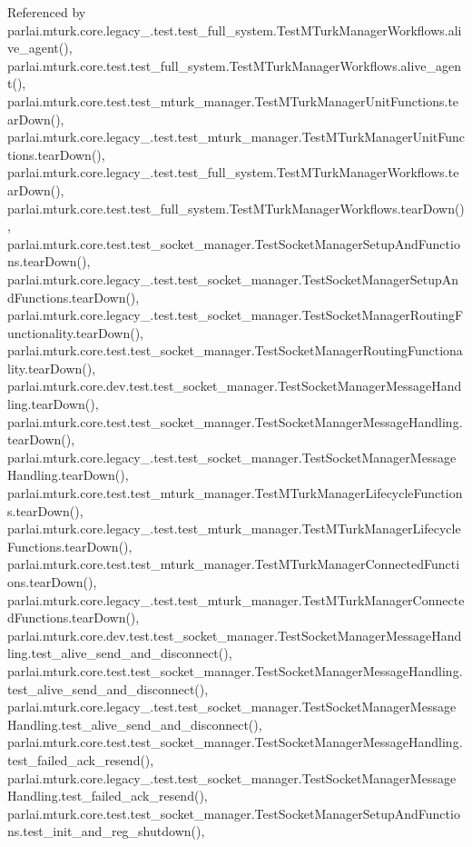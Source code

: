 Referenced by parlai.\+mturk.\+core.\+legacy\+\_.\+test.\+test\+\_\+full\+\_\+system.\+Test\+M\+Turk\+Manager\+Workflows.\+alive\+\_\+agent(), parlai.\+mturk.\+core.\+test.\+test\+\_\+full\+\_\+system.\+Test\+M\+Turk\+Manager\+Workflows.\+alive\+\_\+agent(), parlai.\+mturk.\+core.\+test.\+test\+\_\+mturk\+\_\+manager.\+Test\+M\+Turk\+Manager\+Unit\+Functions.\+tear\+Down(), parlai.\+mturk.\+core.\+legacy\+\_.\+test.\+test\+\_\+mturk\+\_\+manager.\+Test\+M\+Turk\+Manager\+Unit\+Functions.\+tear\+Down(), parlai.\+mturk.\+core.\+legacy\+\_.\+test.\+test\+\_\+full\+\_\+system.\+Test\+M\+Turk\+Manager\+Workflows.\+tear\+Down(), parlai.\+mturk.\+core.\+test.\+test\+\_\+full\+\_\+system.\+Test\+M\+Turk\+Manager\+Workflows.\+tear\+Down(), parlai.\+mturk.\+core.\+test.\+test\+\_\+socket\+\_\+manager.\+Test\+Socket\+Manager\+Setup\+And\+Functions.\+tear\+Down(), parlai.\+mturk.\+core.\+legacy\+\_.\+test.\+test\+\_\+socket\+\_\+manager.\+Test\+Socket\+Manager\+Setup\+And\+Functions.\+tear\+Down(), parlai.\+mturk.\+core.\+legacy\+\_.\+test.\+test\+\_\+socket\+\_\+manager.\+Test\+Socket\+Manager\+Routing\+Functionality.\+tear\+Down(), parlai.\+mturk.\+core.\+test.\+test\+\_\+socket\+\_\+manager.\+Test\+Socket\+Manager\+Routing\+Functionality.\+tear\+Down(), parlai.\+mturk.\+core.\+dev.\+test.\+test\+\_\+socket\+\_\+manager.\+Test\+Socket\+Manager\+Message\+Handling.\+tear\+Down(), parlai.\+mturk.\+core.\+test.\+test\+\_\+socket\+\_\+manager.\+Test\+Socket\+Manager\+Message\+Handling.\+tear\+Down(), parlai.\+mturk.\+core.\+legacy\+\_.\+test.\+test\+\_\+socket\+\_\+manager.\+Test\+Socket\+Manager\+Message\+Handling.\+tear\+Down(), parlai.\+mturk.\+core.\+test.\+test\+\_\+mturk\+\_\+manager.\+Test\+M\+Turk\+Manager\+Lifecycle\+Functions.\+tear\+Down(), parlai.\+mturk.\+core.\+legacy\+\_.\+test.\+test\+\_\+mturk\+\_\+manager.\+Test\+M\+Turk\+Manager\+Lifecycle\+Functions.\+tear\+Down(), parlai.\+mturk.\+core.\+test.\+test\+\_\+mturk\+\_\+manager.\+Test\+M\+Turk\+Manager\+Connected\+Functions.\+tear\+Down(), parlai.\+mturk.\+core.\+legacy\+\_.\+test.\+test\+\_\+mturk\+\_\+manager.\+Test\+M\+Turk\+Manager\+Connected\+Functions.\+tear\+Down(), parlai.\+mturk.\+core.\+dev.\+test.\+test\+\_\+socket\+\_\+manager.\+Test\+Socket\+Manager\+Message\+Handling.\+test\+\_\+alive\+\_\+send\+\_\+and\+\_\+disconnect(), parlai.\+mturk.\+core.\+test.\+test\+\_\+socket\+\_\+manager.\+Test\+Socket\+Manager\+Message\+Handling.\+test\+\_\+alive\+\_\+send\+\_\+and\+\_\+disconnect(), parlai.\+mturk.\+core.\+legacy\+\_.\+test.\+test\+\_\+socket\+\_\+manager.\+Test\+Socket\+Manager\+Message\+Handling.\+test\+\_\+alive\+\_\+send\+\_\+and\+\_\+disconnect(), parlai.\+mturk.\+core.\+test.\+test\+\_\+socket\+\_\+manager.\+Test\+Socket\+Manager\+Message\+Handling.\+test\+\_\+failed\+\_\+ack\+\_\+resend(), parlai.\+mturk.\+core.\+legacy\+\_.\+test.\+test\+\_\+socket\+\_\+manager.\+Test\+Socket\+Manager\+Message\+Handling.\+test\+\_\+failed\+\_\+ack\+\_\+resend(), parlai.\+mturk.\+core.\+test.\+test\+\_\+socket\+\_\+manager.\+Test\+Socket\+Manager\+Setup\+And\+Functions.\+test\+\_\+init\+\_\+and\+\_\+reg\+\_\+shutdown(), 
